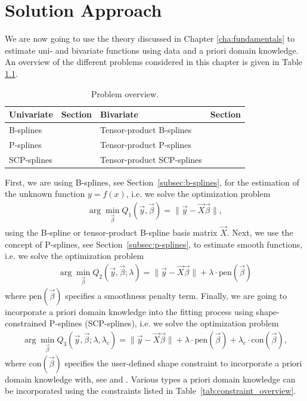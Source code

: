 \chapter{Solution Approach} \label{cha:solution-approach}

We are now going to use the theory discussed in Chapter \ref{cha:fundamentals} to estimate uni- and bivariate  functions using data and a priori domain knowledge. An overview of the different problems considered in this chapter is given in Table \ref{tab:problem_overview}. 

\begin{table}[H]
	\centering
	\begin{tabular}{|l|l|l|l|}
		\hline
		\textbf{Univariate}   & \textbf{Section} & \textbf{Bivariate}         & \textbf{Section} \\ \hline \toprule
		B-splines             &                & Tensor-product B-splines   &               \\ \hline
		P-splines             &                & Tensor-product P-splines   &              \\ \hline
		SCP-splines           & 			   & Tensor-product SCP-splines &     \\ \hline \bottomrule
	\end{tabular}
	\caption{Problem overview.}
	\label{tab:problem_overview}
\end{table}
%
First, we are using B-splines, see Section~\ref{subsec:b-splines}, for the estimation of the unknown function $y = f(x)$, i.e. we solve the optimization problem
\begin{align} \label{eq:OF-B-splines}
	\arg \min_{\vec{\beta}} Q_1(\vec{y}, \vec{\beta}) = \lVert \vec{y} - \vec{X} \vec{\beta} \rVert,
\end{align}
%
using the B-spline or tensor-product B-spline basis matrix $\vec{X}$. Next, we use the concept of P-splines, see Section~\ref{subsec:p-splines}, to estimate smooth functions, i.e. we solve the optimization problem
\begin{align} \label{eq:OF-P-splines}
	\arg \min_{\vec{\beta}} Q_2(\vec{y}, \vec{\beta}; \lambda) = \lVert \vec{y} - \vec{X} \vec{\beta} \rVert + \lambda \cdot \text{pen}(\vec{\beta})
\end{align}
%
where $\text{pen}(\vec{\beta})$ specifies a smoothness penalty term. Finally, we are going to incorporate a priori domain knowledge into the fitting process using shape-constrained P-splines (SCP-splines), i.e. we solve the optimization problem
\begin{align} \label{eq:OF-SCP-splines}
	\arg \min_{\vec{\beta}} Q_3(\vec{y}, \vec{\beta}; \lambda, \lambda_c) = \lVert \vec{y} - \vec{X} \vec{\beta} \rVert + \lambda \cdot \text{pen}(\vec{\beta}) + \lambda_c \cdot \text{con}(\vec{\beta}),
\end{align}
%
where $\text{con}({\vec{\beta}})$ specifies the user-defined shape constraint to incorporate a priori domain knowledge with, see \cite{hofner2011monotonicity} and \cite{bollaerts2006simple}. Various types a priori domain knowledge can be incorporated using the constraints listed in Table~\ref{tab:constraint_overview}.

